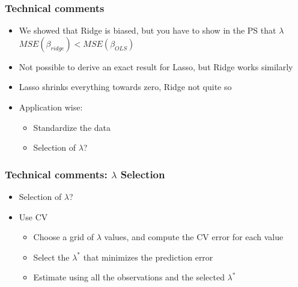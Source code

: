 \documentclass[
  shownotes,
  xcolor={svgnames},
  hyperref={colorlinks,citecolor=DarkBlue,linkcolor=DarkRed,urlcolor=DarkBlue}
  , aspectratio=169]{beamer}
\begin{document}
\begin{frame}[fragile]
\frametitle{Technical comments}

\begin{itemize}
 \item We showed that Ridge is biased, but you have to show in the PS that $\lambda$ $MSE(\beta_{ridge})<MSE(\beta_{OLS})$
 \medskip
 \item Not possible to derive an exact result for Lasso, but Ridge works similarly
 \medskip
 \item Lasso shrinks everything towards zero, Ridge not quite so
 \medskip
 \item Application wise:
\begin{itemize}
  \medskip
 \item Standardize the data
 \medskip
 \item Selection of $\lambda$?
\end{itemize}
\end{itemize}

 \end{frame}
\begin{frame}[fragile]
\frametitle{Technical comments: $\lambda$ Selection}
\begin{itemize}
 \item Selection of $\lambda$?
 \bigskip
 \item Use CV
 \bigskip
 \begin{itemize}
 \item Choose a grid of $\lambda$ values, and compute the CV error for each value
 \medskip
 \item Select the $\lambda^*$ that minimizes the prediction error
 \medskip
 \item Estimate using all the observations and the selected $\lambda^*$
\end{itemize}
\end{itemize}



\end{frame}

\end{document}

